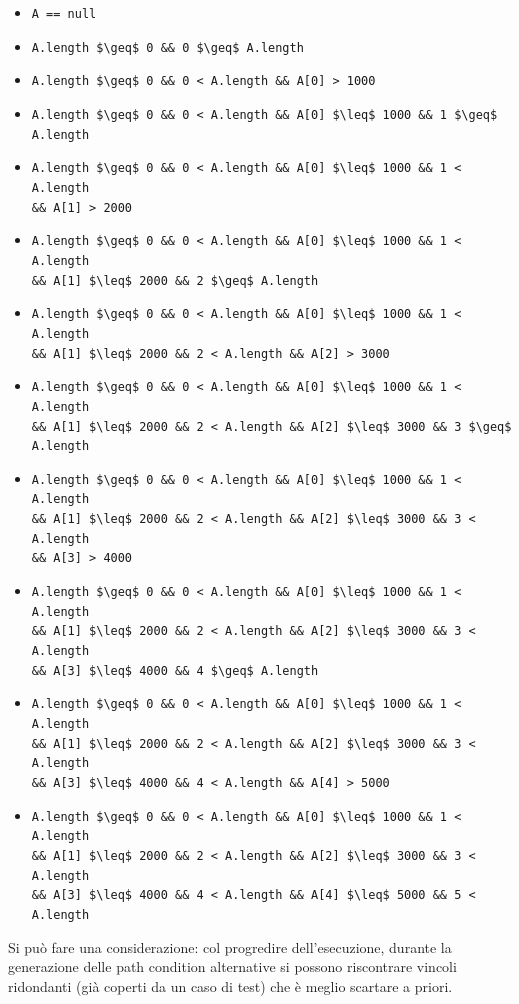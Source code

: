\documentclass[a4paper, 12pt, oneside]{book}
\theoremstyle{normal}
\begin{document}
\begin{itemize}[itemsep=0pt, topsep=2pt]
    \item \lstinline|A == null|
    \item \lstinline|A.length $\geq$ 0 && 0 $\geq$ A.length|
    \item \lstinline|A.length $\geq$ 0 && 0 < A.length && A[0] > 1000|
    \item \lstinline|A.length $\geq$ 0 && 0 < A.length && A[0] $\leq$ 1000 && 1 $\geq$ A.length|
    \item \lstinline|A.length $\geq$ 0 && 0 < A.length && A[0] $\leq$ 1000 && 1 < A.length| \\
\lstinline|&& A[1] > 2000|
    \item \lstinline|A.length $\geq$ 0 && 0 < A.length && A[0] $\leq$ 1000 && 1 < A.length| \\
\lstinline|&& A[1] $\leq$ 2000 && 2 $\geq$ A.length|
    \item \lstinline|A.length $\geq$ 0 && 0 < A.length && A[0] $\leq$ 1000 && 1 < A.length| \\
\lstinline|&& A[1] $\leq$ 2000 && 2 < A.length && A[2] > 3000|
    \item \lstinline|A.length $\geq$ 0 && 0 < A.length && A[0] $\leq$ 1000 && 1 < A.length| \\
\lstinline|&& A[1] $\leq$ 2000 && 2 < A.length && A[2] $\leq$ 3000 && 3 $\geq$ A.length|
    \item \lstinline|A.length $\geq$ 0 && 0 < A.length && A[0] $\leq$ 1000 && 1 < A.length| \\
\lstinline|&& A[1] $\leq$ 2000 && 2 < A.length && A[2] $\leq$ 3000 && 3 < A.length| \\
\lstinline|&& A[3] > 4000|
    \item \lstinline|A.length $\geq$ 0 && 0 < A.length && A[0] $\leq$ 1000 && 1 < A.length| \\
\lstinline|&& A[1] $\leq$ 2000 && 2 < A.length && A[2] $\leq$ 3000 && 3 < A.length| \\
\lstinline|&& A[3] $\leq$ 4000 && 4 $\geq$ A.length|
    \item \lstinline|A.length $\geq$ 0 && 0 < A.length && A[0] $\leq$ 1000 && 1 < A.length| \\
\lstinline|&& A[1] $\leq$ 2000 && 2 < A.length && A[2] $\leq$ 3000 && 3 < A.length| \\
\lstinline|&& A[3] $\leq$ 4000 && 4 < A.length && A[4] > 5000|
    \item \lstinline|A.length $\geq$ 0 && 0 < A.length && A[0] $\leq$ 1000 && 1 < A.length| \\
\lstinline|&& A[1] $\leq$ 2000 && 2 < A.length && A[2] $\leq$ 3000 && 3 < A.length| \\
\lstinline|&& A[3] $\leq$ 4000 && 4 < A.length && A[4] $\leq$ 5000 && 5 < A.length| \\
\end{itemize}
Si può fare una considerazione: col progredire dell'esecuzione, durante la generazione delle path condition alternative si possono riscontrare vincoli ridondanti (già coperti da un caso di test) che è meglio scartare a priori.
\end{document}
